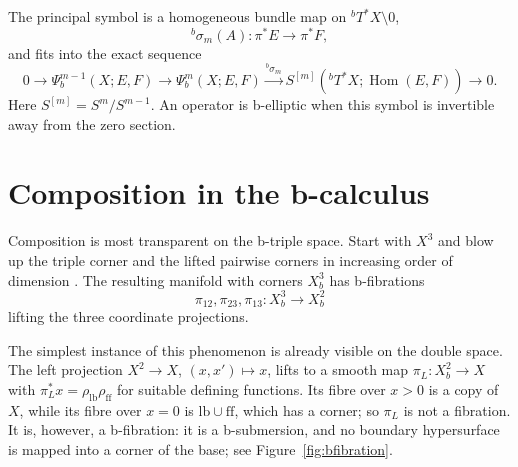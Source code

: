 \documentclass[12pt,oneside,reqno]{article}
\theoremstyle{plain}
\theoremstyle{definition}
\theoremstyle{remark}
\begin{document}
The principal symbol is a homogeneous bundle map on
\({}^bT^*X\setminus0\),
\[
 {}^b\sigma_m(A):
 \pi^*E\longrightarrow\pi^*F,
\]
and fits into the exact sequence
\[
 0\longrightarrow\Psi_b^{m-1}(X;E,F)
 \longrightarrow\Psi_b^m(X;E,F)
 \xrightarrow{{}^b\sigma_m}
 S^{[m]}({}^bT^*X;\operatorname{Hom}(E,F))
 \longrightarrow0.
\]
Here \(S^{[m]}=S^m/S^{m-1}\). An operator is b-elliptic when this symbol is
invertible away from the zero section.

\section{Composition in the b-calculus}

Composition is most transparent on the b-triple space. Start with \(X^3\)
and blow up the triple corner and the lifted pairwise corners in increasing
order of dimension \cite[(2.31)]{MelroseBlowup}. The resulting manifold
with corners \(X_b^3\) has
b-fibrations
\[
 \pi_{12},\pi_{23},\pi_{13}:X_b^3\longrightarrow X_b^2
\]
lifting the three coordinate projections.

The simplest instance of this phenomenon is already visible on the double
space.  The left projection \(X^2\to X\), \((x,x')\mapsto x\), lifts to a
smooth map \(\pi_L:X_b^2\to X\) with \(\pi_L^*x=\rho_{\mathrm{lb}}
\rho_{\mathrm{ff}}\) for suitable defining functions.  Its fibre over
\(x>0\) is a copy of \(X\), while its fibre over \(x=0\) is
\(\mathrm{lb}\cup\mathrm{ff}\), which has a corner; so \(\pi_L\) is not a
fibration.  It is, however, a b-fibration: it is a b-submersion, and no
boundary hypersurface is mapped into a corner of the base; see
Figure~\ref{fig:bfibration}.
\end{document}
